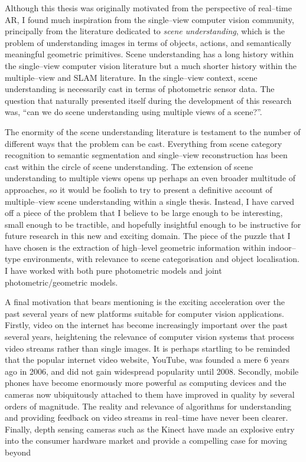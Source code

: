Although this thesis was originally motivated from the perspective of
real--time AR, I found much inspiration from the single--view computer
vision community, principally from the literature dedicated to
\textit{scene understanding}, which is the problem of understanding
images in terms of objects, actions, and semantically meaningful
geometric primitives. Scene understanding has a long history within
the single--view computer vision literature but a much shorter history
within the multiple--view and SLAM literature. In the single--view
context, scene understanding is necessarily cast in terms of
photometric sensor data. The question that naturally presented itself
during the development of this research was, ``can we do scene
understanding using multiple views of a scene?''.

The enormity of the scene understanding literature is testament to the
number of different ways that the problem can be cast. Everything from
scene category recognition to semantic segmentation and single--view
reconstruction has been cast within the circle of scene
understanding. The extension of scene understanding to multiple views
opens up perhaps an even broader multitude of approaches, so it would
be foolish to try to present a definitive account of multiple--view
scene understanding within a single thesis. Instead, I have carved off
a piece of the problem that I believe to be large enough to be
interesting, small enough to be tractible, and hopefully insightful
enough to be instructive for future research in this new and exciting
domain. The piece of the puzzle that I have chosen is the extraction
of high--level geometric information within indoor--type environments,
with relevance to scene categorisation and object localisation. I have
worked with both pure photometric models and joint
photometric/geometric models.



A final motivation that bears mentioning is the exciting acceleration
over the past several years of new platforms suitable for computer
vision applications. Firstly, video on the
internet has become increasingly important over the past several
years, heightening the relevance of computer vision systems that
process video streams rather than single images. It is perhaps
startling to be reminded that the popular internet video website,
YouTube, was founded a mere 6 years ago in 2006, and did not gain
widespread popularity until 2008. Secondly, mobile phones have become
enormously more powerful as computing devices and the cameras now
ubiquitously attached to them have improved in quality by several
orders of magnitude. The reality and relevance of algorithms for
understanding and providing feedback on video streams in real--time
have never been clearer. Finally, depth sensing cameras such as the
Kinect have made an explosive entry into the consumer hardware market
and provide a compelling case for moving beyond

